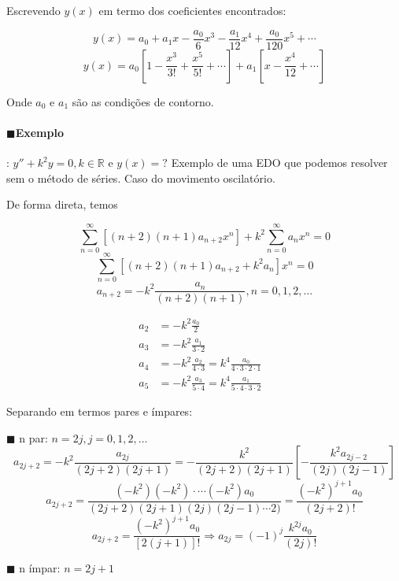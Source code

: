     Escrevendo \( y(x) \) em termo dos coeficientes encontrados: 

    \[ y(x) =  a_0 + a_1 x  - \frac{a_0}{6}x^3 - \frac{a_1}{12}x^4 + \frac{a_0}{120} x^5 + \cdots \]
    \[ y(x) = a_0 \left[ 1 - \frac{x^3}{3!} + \frac{x^5}{5!} + \cdots  \right] + a_1 \left[ x -
    \frac{x^4}{12} + \cdots  \right]\]

    Onde \( a_0 \) e \( a_1 \) são as condições de contorno.

    \paragraph{$\blacksquare$Exemplo}: \( y'' + k^2 y = 0, k \in \mathbb{R} \text{ e } y (x) = ?  \)
    Exemplo de uma EDO que podemos resolver sem o método de séries. Caso do movimento oscilatório.


    De forma direta, temos

    \[ \sum_{n = 0}^{\infty} \left[ (n+2) (n+1) a_{n + 2} x^n \right]  + k^2 \sum_{n = 0}^{\infty} a_n x^n = 0\]
    \[ \sum_{n = 0}^{\infty} \left[ (n+2)(n + 1) a_{n + 2} + k^2 a_n \right] x^n = 0  \]
    \[ a_{n + 2} = - k^2 \frac{a_n}{(n + 2)(n + 1)}, n = 0, 1, 2, ... \]

     $$ \begin{flalign*}
    a_2 & = - k^2 \frac{a_0}{2} &\\
    a_3 & = -k^2 \frac{a_1}{3 \cdot  2} &\\
    a_4 & = -k^2 \frac{a_2}{4 \cdot 3 } = k^4 \frac{a_0}{4 \cdot  3 \cdot  2 \cdot  1 }&\\
    a_5 & = -k^2 \frac{a_3}{5 \cdot 4 } = k^4 \frac{a_1}{5 \cdot  4 \cdot  3 \cdot  2 }
    \end{flalign*} $$

    Separando em termos pares e ímpares:

    \item{$\blacksquare$} n par: \( n = 2j, j = 0, 1, 2, ... \)
      \[ a_{2j + 2} = - k^2 \frac{a_{2j}}{(2j + 2)(2j + 1)} = - \frac{k^2}{(2j+2)(2j+1)} \left[ -
      \frac{k^2 a_{2j - 2}}{(2j)(2j -1)} \right]  \]
      \[ a_{2j + 2} = \frac{(-k^2)(-k^2)\cdot  \cdots (-k^2) a_0}{(2j+2)(2j + 1)(2j)(2j - 1) \cdots
      2)} = \frac{(-k^2)^{j + 1} a_0}{(2j + 2)!}\]
      \[ a_{2j + 2} = \frac{(-k^2)^{j + 1} a_0}{[2(j + 1)]!} \Rightarrow \boxed{ a_{2j} = (-1)^j\frac{
      k^{2j} a_0}{(2j)!}} \]
      
    \item{$\blacksquare$} n ímpar: \( n = 2j + 1 \) 

